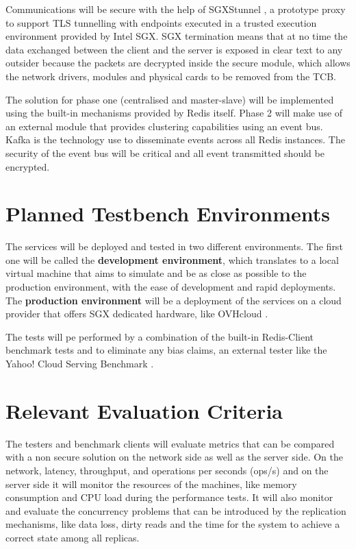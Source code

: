 Communications will be secure with the help of SGXStunnel \cite{sgxstunnel:1}, a prototype proxy to support TLS tunnelling with endpoints executed in a trusted execution environment provided by Intel SGX. \gls{SGX} termination means that at no time the data exchanged between the client and the server is exposed in clear text to any outsider because the packets are decrypted inside the secure module, which allows the network drivers, modules and physical cards to be removed from the \gls{TCB}.

The solution for phase one (centralised and master-slave) will be implemented using the built-in mechanisms provided by Redis itself. Phase 2 will make use of an external module that provides clustering capabilities using an event bus. Kafka \cite{kafka:1} is the technology use to disseminate events across all Redis instances. The security of the event bus will be critical and all event transmitted should be encrypted.

\section{Planned Testbench Environments} %
\label{sec:planned_testbench_environments}

The services will be deployed and tested in two different environments. The first one will be called the \textbf{development environment}, which translates to a local virtual machine that aims to simulate and be as close as possible to the production environment, with the ease of development and rapid deployments. The \textbf{production environment} will be a deployment of the services on a cloud provider that offers \gls{SGX} dedicated hardware, like OVHcloud \cite{ovhcloud:1}.

The tests will pe performed by a combination of the built-in Redis-Client benchmark tests \cite{redis_benchmark_cli:1} and to eliminate any bias claims, an external tester like the Yahoo! Cloud Serving Benchmark \cite{yahoo_benchmark:1}.

\section{Relevant Evaluation Criteria} %
\label{sec:relevant_evaluation_criteria}

The testers and benchmark clients will evaluate metrics that can be compared with a non secure solution on the network side as well as the server side. On the network, latency, throughput, and operations per seconds (ops/s) and on the server side it will monitor the resources of the machines, like memory consumption and CPU load during the performance tests. It will also monitor and evaluate the concurrency problems that can be introduced by the replication mechanisms, like data loss, dirty reads and the time for the system to achieve a correct state among all replicas.
